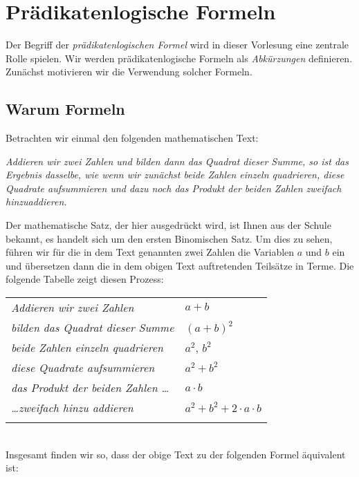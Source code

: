 \chapter{Pr\"adikatenlogische Formeln}
Der Begriff der \emph{pr\"adikatenlogischen Formel} wird in dieser Vorlesung eine zentrale
Rolle spielen.  Wir werden pr\"adikatenlogische Formeln als \emph{Abk\"urzungen} definieren.  
Zun\"achst motivieren wir die Verwendung solcher Formeln.

\section{Warum Formeln}
Betrachten wir einmal den folgenden mathematischen Text: 
\begin{center}
\begin{minipage}{14cm}
{\em 
  Addieren wir zwei Zahlen und bilden dann das Quadrat dieser Summe, so ist das Ergebnis dasselbe,
  wie wenn wir zun\"achst beide Zahlen einzeln quadrieren, diese Quadrate aufsummieren 
  und dazu noch das Produkt der beiden Zahlen zweifach hinzuaddieren.
}
\end{minipage}
\end{center}
Der mathematische Satz, der hier ausgedr\"uckt wird, ist Ihnen aus der Schule bekannt,
es handelt sich um den ersten Binomischen Satz.  Um dies zu sehen, f\"uhren wir f\"ur die
in dem Text genannten zwei Zahlen die Variablen $a$ und $b$ ein und \"ubersetzen dann die 
in dem obigen Text auftretenden Teils\"atze in Terme.  Die folgende Tabelle zeigt diesen Prozess: \\[0.3cm]
\hspace*{1.3cm} 
\begin{tabular}{ll}
  \emph{Addieren wir zwei Zahlen} & $a+b$ \\
  \emph{bilden das Quadrat dieser Summe} & $(a+b)^2$ \\
  \emph{beide Zahlen einzeln quadrieren} & $a^2$, $b^2$ \\
  \emph{diese Quadrate aufsummieren} & $a^2 + b^2$ \\
  \emph{das Produkt der beiden Zahlen \ldots} & $a\cdot b$ \\
  \emph{\ldots zweifach hinzu addieren} & $a^2 + b^2 + 2\cdot a \cdot b $ \\
  \emph{} & $ $ \\
\end{tabular} \\
Insgesamt finden wir so, dass der obige Text zu der folgenden Formel \"aquivalent ist: \\[0.2cm]

